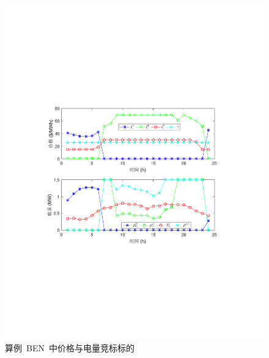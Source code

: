 \begin{figure}[!t]
\centering
\includegraphics[scale=0.75]{figures/Chap4-8-BENBid.pdf}
\caption{算例~BEN~中价格与电量竞标标的}
\label{Fig:BAUCase}
\end{figure}

